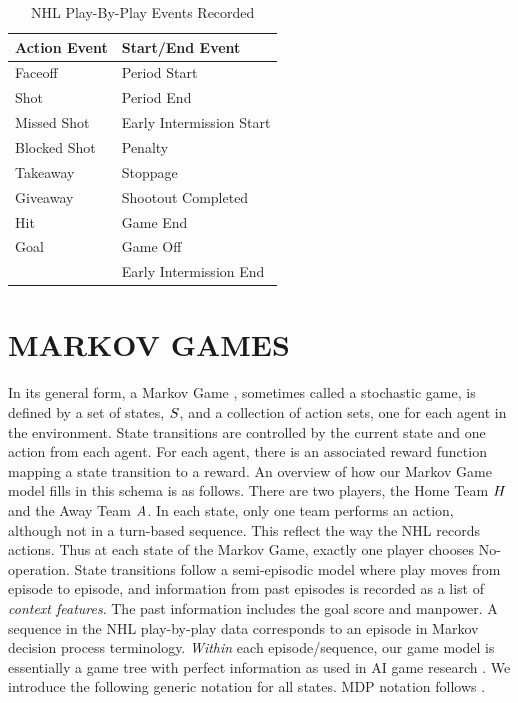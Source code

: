 \documentclass[]{article}
\begin{document}
\begin{table}[htb]
\caption{NHL Play-By-Play Events Recorded}
\label{table:events-recorded}
\begin{center}
\begin{tabular}{|l|l|}
\hline
 \bf{Action Event} & \bf{Start/End Event}\\ \hline
Faceoff & Period Start \\\hline
Shot & Period End \\\hline
Missed Shot & Early Intermission Start\\ \hline
Blocked Shot & Penalty\\ \hline
Takeaway & Stoppage\\  \hline
Giveaway & Shootout Completed\\ \hline
Hit & Game End\\ \hline
Goal & Game Off\\ \hline
& Early Intermission End \\
\hline
\end{tabular}
\end{center}
\end{table}



\section{MARKOV GAMES}
In its general form, a Markov Game \citep{Littman1994}, sometimes called a stochastic game, is defined by a set of states, $S$, and a collection of action sets, one for each agent in the environment. State transitions are controlled by the current state and one action from each agent. For each agent, there is an associated reward function mapping a state transition to a reward. An overview of how our Markov Game model fills in this schema is as follows. There are two players, the Home Team $H$ and the Away Team $A$.
In each state, only one team performs an action, although not in a turn-based sequence. This reflect the way the NHL records actions. Thus at each state of the Markov Game, exactly one player chooses No-operation. State transitions follow a semi-episodic model \citep{bib:sutton} where play moves from episode to episode, and information from past episodes is recorded as a list of {\em context features}. The past information includes the goal score and manpower. A sequence in the NHL play-by-play data corresponds to an episode in Markov decision process terminology. {\em Within} each episode/sequence, our game model is essentially a game tree with perfect information as used in AI game research \citep{Russell2010}. We introduce the following generic notation for all states. MDP notation follows \citep{Russell2010,Littman1994}.
\end{document}
